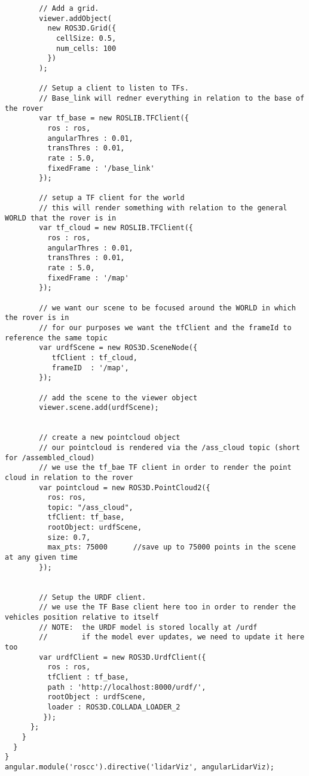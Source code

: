 \begin{verbatim}
        // Add a grid.
        viewer.addObject(
          new ROS3D.Grid({
            cellSize: 0.5,
            num_cells: 100
          })
        );

        // Setup a client to listen to TFs.
        // Base_link will redner everything in relation to the base of the rover
        var tf_base = new ROSLIB.TFClient({
          ros : ros,
          angularThres : 0.01,
          transThres : 0.01,
          rate : 5.0,
          fixedFrame : '/base_link'
        });

        // setup a TF client for the world
        // this will render something with relation to the general WORLD that the rover is in
        var tf_cloud = new ROSLIB.TFClient({
          ros : ros,
          angularThres : 0.01,
          transThres : 0.01,
          rate : 5.0,
          fixedFrame : '/map'
        });

        // we want our scene to be focused around the WORLD in which the rover is in
        // for our purposes we want the tfClient and the frameId to reference the same topic
        var urdfScene = new ROS3D.SceneNode({
           tfClient : tf_cloud,
           frameID  : '/map',
        });

        // add the scene to the viewer object
        viewer.scene.add(urdfScene);


        // create a new pointcloud object
        // our pointcloud is rendered via the /ass_cloud topic (short for /assembled_cloud)
        // we use the tf_bae TF client in order to render the point cloud in relation to the rover
        var pointcloud = new ROS3D.PointCloud2({
          ros: ros,
          topic: "/ass_cloud",
          tfClient: tf_base,
          rootObject: urdfScene,
          size: 0.7,
          max_pts: 75000      //save up to 75000 points in the scene at any given time
        });


        // Setup the URDF client.
        // we use the TF Base client here too in order to render the vehicles position relative to itself
        // NOTE:  the URDF model is stored locally at /urdf
        //        if the model ever updates, we need to update it here too
        var urdfClient = new ROS3D.UrdfClient({
          ros : ros,
          tfClient : tf_base,
          path : 'http://localhost:8000/urdf/',
          rootObject : urdfScene,
          loader : ROS3D.COLLADA_LOADER_2
         });
      };
    }
  }
}
angular.module('roscc').directive('lidarViz', angularLidarViz);
\end{verbatim}



